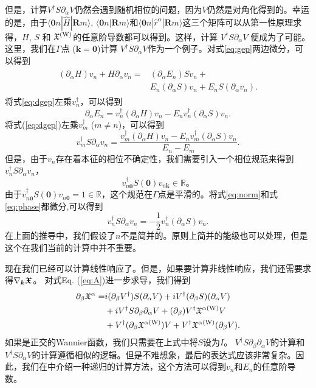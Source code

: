 但是，计算$V^{\dagger}S\partial_{\alpha}V$仍然会遇到随机相位的问题，因为$V$仍然是对角化得到的。幸运的是，由于$\langle\boldsymbol{0}n|\hat{H}|\boldsymbol{R}m\rangle$,
$\langle\boldsymbol{0}n|\boldsymbol{R}m\rangle$和$\langle\boldsymbol{0}n|\hat{r}^{\alpha}|\boldsymbol{R}m\rangle$这三个矩阵可以从第一性原理求得，$H$, $S$ 和 $\mathfrak{X}^{(\text{W})}$的任意阶导数都可以得到。这样，计算 $V^{\dagger}S\partial_{\alpha}V$ \cite{van2007computation}便成为了可能。这里，我们在$\Gamma$点 ($\boldsymbol{k}=\boldsymbol{0}$)计算
$V^{\dagger}S\partial_{\alpha}V$作为一个例子。对式\ref{eq:gep}两边微分，可以得到
\begin{align}
\begin{split}
(\partial_\alpha H)v_n+H\partial_\alpha v_n = & (\partial_\alpha E_n)Sv_n+\\
& E_n(\partial_\alpha S)v_n+E_n S(\partial_\alpha v_n).\label{eq:dgep}
\end{split}
\end{align}
将式\ref{eq:dgep}左乘$v_{n}^{\dagger}$，可以得到
\[
\partial_\alpha E_{n}=v_{n}^{\dagger}(\partial_\alpha H) v_{n}-E_{n}v_{n}^{\dagger}(\partial_\alpha S)v_{n}.
\]
将式(\ref{eq:dgep})左乘$v_{m}^{\dagger}$ ($m\ne n$)，可以得到
\[
v_{m}^{\dagger}S\partial_\alpha v_{n}=\frac{v_{m}^{\dagger}(\partial_\alpha H)v_{n}-E_{n}v_{m}^{\dagger}(\partial_\alpha S)v_{n}}{E_n-E_m}.
\]
但是，由于$v_{n}$存在着本征的相位不确定性，我们需要引入一个相位规范来得到$v_{n}^{\dagger}S \partial_\alpha v_{n}$，
\begin{equation}
v_{n\boldsymbol{0}}^{\dagger}S(\boldsymbol{0})v_{n\boldsymbol{k}}\in\mathbb{R}。\label{eq:phase}
\end{equation}
由于$v_{n\boldsymbol{0}}^{\dagger}S(\boldsymbol{0})v_{n\boldsymbol{0}}=1\in\mathbb{R}$，这个规范在$\Gamma$点是平滑的。将式\ref{eq:norm}和式\ref{eq:phase}都微分,可以得到
\[
v_{n}^{\dagger}S\partial_\alpha v_n=-\frac{1}{2}v_{n}^{\dagger}(\partial_\alpha S)v_n.
\]
在上面的推导中，我们假设了$n$不是简并的。原则上简并的能级也可以处理\cite{andrew1998computation}，但是这个在我们当前的计算中并不重要。

现在我们已经可以计算线性响应了。但是，如果要计算非线性响应，我们还需要求得$\nabla_{\boldsymbol{k}}\boldsymbol{\mathfrak{X}}$。 对式Eq. (\ref{eq:A})进一步求导，我们得到
\begin{equation}
\begin{split}
\partial_{\beta}\mathfrak{X}^{\alpha}  = &i(\partial_{\beta}V^{\dagger})S(\partial_{\alpha}V)+iV^{\dagger}(\partial_{\beta}S)(\partial_{\alpha}V)\\
&+iV^{\dagger}S\partial_{\beta}\partial_{\alpha}V+(\partial_{\beta})V^{\dagger}\mathfrak{X}^{\alpha(\text{W})}V\\
&+V^{\dagger}(\partial_{\beta}\mathfrak{X}^{\alpha(\text{W})})V+V^{\dagger}\mathfrak{X}^{\alpha(\text{W})}(\partial_{\beta}V).
\end{split}
\end{equation}
如果是正交的Wannier函数\cite{wang_first-principles_2017}，我们只需要在上式中将$S$设为$I$。 $V^{\dagger}S\partial_{\beta}\partial_{\alpha}V$的计算和$V^{\dagger}S\partial_{\alpha}V$的计算遵循相似的逻辑。但是不难想象，最后的表达式应该非常复杂。因此，我们在中介绍一种递归的计算方法，这个方法可以得到$v_n$和$E_{n}$的任意阶导数。


